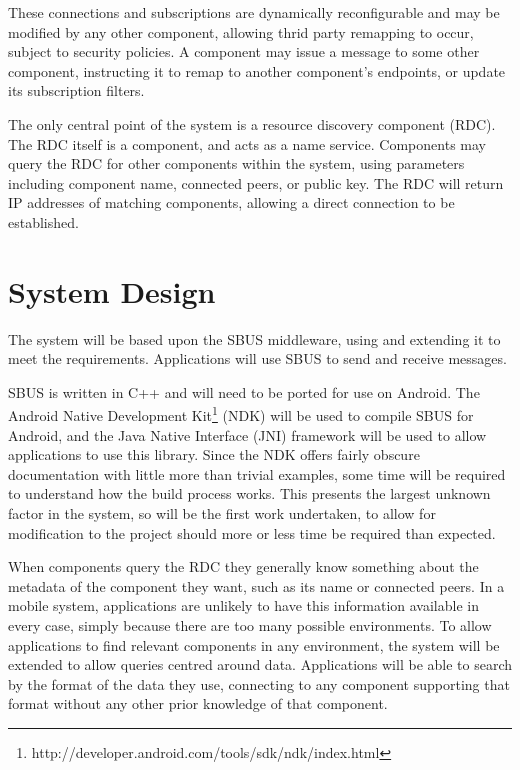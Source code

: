 \documentclass[12pt,twoside,notitlepage]{report}
\begin{document}
These connections and subscriptions are dynamically reconfigurable and may be modified by any other component, allowing thrid party remapping to occur, subject to security policies. 
A component may issue a message to some other component, instructing it to remap to another component's endpoints, or update its subscription filters.

The only central point of the system is a resource discovery component (RDC). 
The RDC itself is a component, and acts as a name service. 
Components may query the RDC for other components within the system, using parameters including component name, connected peers, or public key. 
The RDC will return IP addresses of matching components, allowing a direct connection to be established.

\section{System Design}

The system will be based upon the SBUS middleware, using and extending it to meet the requirements. 
Applications will use SBUS to send and receive messages.

SBUS is written in C++ and will need to be ported for use on Android. 
The Android Native Development Kit\footnote{http://developer.android.com/tools/sdk/ndk/index.html} (NDK) will be used to compile SBUS for Android, and the Java Native Interface (JNI) framework will be used to allow applications to use this library. 
Since the NDK offers fairly obscure documentation with little more than trivial examples, some time will be required to understand how the build process works. This presents the largest unknown factor in the system, so will be the first work undertaken, to allow for modification to the project should more or less time be required than expected.

When components query the RDC they generally know something about the metadata of the component they want, such as its name or connected peers. 
In a mobile system, applications are unlikely to have this information available in every case, simply because there are too many possible environments. 
To allow applications to find relevant components in any environment, the system will be extended to allow queries centred around data.
Applications will be able to search by the format of the data they use, connecting to any component supporting that format without any other prior knowledge of that component.
\end{document}
